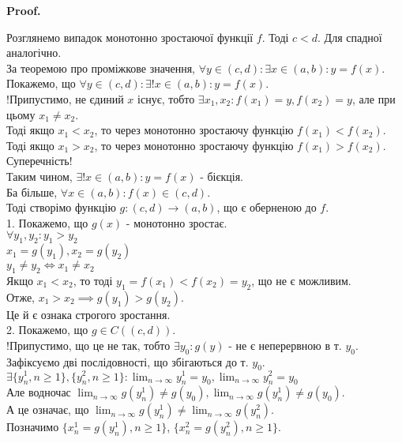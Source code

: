 \documentclass[a4paper, 14pt]{article}
\makeatletter
\def\huge{\displaystyle}
\def\qed{$\blacksquare$}
\theoremstyle{theoremdd}
\theoremstyle{theoremdd}
\theoremstyle{theoremdd}
\theoremstyle{theoremdd}
\theoremstyle{theoremdd}
\theoremstyle{theoremdd}
\theoremstyle{theoremdd}
\theoremstyle{theoremdd}
\renewenvironment{proof}[1][Proof.\\]{\par
\pushQED{\hfill \qed}%
\normalfont \topsep6\p@\@plus6\p@\relax
\trivlist
\item\relax
{\bfseries
#1\@addpunct{.}}\hspace\labelsep\ignorespaces
}{%
\popQED\endtrivlist\@endpefalse
}
\makeatother
\begin{document}
\begin{proof}
Розглянемо випадок монотонно зростаючої функції $f$. Тоді $c < d$. Для спадної аналогічно.\\
За теоремою про проміжкове значення, $\forall y \in (c,d): \exists x \in (a,b): y = f(x)$.\\
Покажемо, що $\forall y \in (c,d): \exists ! x \in (a,b): y = f(x)$.\\
!Припустимо, не єдиний $x$ існує, тобто $\exists x_1, x_2: f(x_1) = y, f(x_2) = y$, але при цьому $x_1 \neq x_2$.\\
Тоді якщо $x_1 < x_2$, то через монотонно зростаючу функцію $f(x_1) < f(x_2)$.\\
Тоді якщо $x_1 > x_2$, то через монотонно зростаючу функцію $f(x_1) > f(x_2)$.\\
Суперечність!\\
Таким чином, $\exists ! x \in (a,b): y = f(x)$ - бієкція.\\
Ба більше, $\forall x \in (a,b): f(x) \in (c,d)$.\\
Тоді створімо функцію $g: (c,d) \to (a,b)$, що є оберненою до $f$.\\
1. Покажемо, що $g(x)$ - монотонно зростає.\\
$\forall y_1,y_2: y_1 > y_2$\\
$x_1 = g(y_1), x_2 = g(y_2)$\\
$y_1 \neq y_2 \iff x_1 \neq x_2$\\
Якщо $x_1 < x_2$, то тоді $y_1 = f(x_1) < f(x_2) = y_2$, що не є можливим.\\
Отже, $x_1 > x_2 \implies g(y_1) > g(y_2)$.\\
Це й є ознака строгого зростання.
\bigskip \\
2. Покажемо, що $g \in C((c,d))$.\\
!Припустимо, що це не так, тобто $\exists y_0: g(y)$ - не є неперервною в т. $y_0$.\\
Зафіксуємо дві послідовності, що збігаються до т. $y_0$.\\
$\exists \{y_n^1, n \geq 1\}, \{y_n^2, n \geq 1\}: \huge \lim_{n \to \infty} y_n^1 = y_0, \huge \lim_{n \to \infty} y_n^2 = y_0$\\
Але водночас $\huge \lim_{n \to \infty} g(y_n^1) \neq g(y_0), \huge \lim_{n \to \infty} g(y_n^1) \neq g(y_0)$.\\
А це означає, що $\huge \lim_{n \to \infty} g(y_n^1) \neq \lim_{n \to \infty} g(y_n^2)$.\\
Позначимо $\{x_n^1 = g(y_n^1), n \geq 1 \}$, $\{x_n^2 = g(y_n^2), n \geq 1 \}$.\\

\end{proof}
\end{document}
